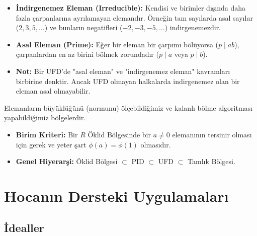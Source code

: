 \documentclass[11pt, a4paper]{article}
\begin{document}
\begin{konubox}[title=\faBook\enspace 9. İndirgenemez ve Asal Elemanlar]
\begin{itemize}
    \item \textbf{İndirgenemez Eleman (Irreducible):} Kendisi ve birimler dışında daha fazla çarpanlarına ayrılamayan elemandır. Örneğin tam sayılarda asal sayılar ($2, 3, 5, \dots$) ve bunların negatifleri ($-2, -3, -5, \dots$) indirgenemezdir.
    \item \textbf{Asal Eleman (Prime):} Eğer bir eleman bir çarpımı bölüyorsa ($p \mid ab$), çarpanlardan en az birini bölmek zorundadır ($p \mid a$ veya $p \mid b$).
    \item \textbf{Not:} Bir UFD'de "asal eleman" ve "indirgenemez eleman" kavramları birbirine denktir. Ancak UFD olmayan halkalarda indirgenemez olan bir eleman asal olmayabilir.
\end{itemize}
\end{konubox}

\begin{konubox}[title=\faBook\enspace 10. Öklid Bölgesi ve Hiyerarşi]
Elemanların büyüklüğünü (normunu) ölçebildiğimiz ve kalanlı bölme algoritması yapabildiğimiz bölgelerdir.
\begin{itemize}
    \item \textbf{Birim Kriteri:} Bir $R$ Öklid Bölgesinde bir $a \neq 0$ elemanının tersinir olması için gerek ve yeter şart $\phi(a) = \phi(1)$ olmasıdır.
    \item \textbf{Genel Hiyerarşi:} Öklid Bölgesi $\subset$ PID $\subset$ UFD $\subset$ Tamlık Bölgesi.
\end{itemize}
\end{konubox}

\newpage
\section{Hocanın Dersteki Uygulamaları}
\subsection{İdealler}
\end{document}
